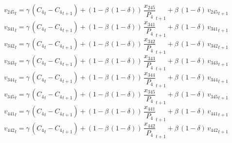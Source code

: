 \begin{dmath}
{{v_{245}}}_{t}={{\gamma}}\, \left({{C_{4}}}_{t}-{{C_{4}}}_{t+1}\right)+\left(1-{{\beta}}\, \left(1-{{\delta}}\right)\right)\, {{\frac{x_{245}}{P_{4}}}}_{t+1}+{{\beta}}\, \left(1-{{\delta}}\right)\, {{v_{245}}}_{t+1}
\end{dmath}
\begin{dmath}
{{v_{341}}}_{t}={{\gamma}}\, \left({{C_{4}}}_{t}-{{C_{4}}}_{t+1}\right)+\left(1-{{\beta}}\, \left(1-{{\delta}}\right)\right)\, {{\frac{x_{341}}{P_{4}}}}_{t+1}+{{\beta}}\, \left(1-{{\delta}}\right)\, {{v_{341}}}_{t+1}
\end{dmath}
\begin{dmath}
{{v_{342}}}_{t}={{\gamma}}\, \left({{C_{4}}}_{t}-{{C_{4}}}_{t+1}\right)+\left(1-{{\beta}}\, \left(1-{{\delta}}\right)\right)\, {{\frac{x_{342}}{P_{4}}}}_{t+1}+{{\beta}}\, \left(1-{{\delta}}\right)\, {{v_{342}}}_{t+1}
\end{dmath}
\begin{dmath}
{{v_{343}}}_{t}={{\gamma}}\, \left({{C_{4}}}_{t}-{{C_{4}}}_{t+1}\right)+\left(1-{{\beta}}\, \left(1-{{\delta}}\right)\right)\, {{\frac{x_{343}}{P_{4}}}}_{t+1}+{{\beta}}\, \left(1-{{\delta}}\right)\, {{v_{343}}}_{t+1}
\end{dmath}
\begin{dmath}
{{v_{344}}}_{t}={{\gamma}}\, \left({{C_{4}}}_{t}-{{C_{4}}}_{t+1}\right)+\left(1-{{\beta}}\, \left(1-{{\delta}}\right)\right)\, {{\frac{x_{344}}{P_{4}}}}_{t+1}+{{\beta}}\, \left(1-{{\delta}}\right)\, {{v_{344}}}_{t+1}
\end{dmath}
\begin{dmath}
{{v_{345}}}_{t}={{\gamma}}\, \left({{C_{4}}}_{t}-{{C_{4}}}_{t+1}\right)+\left(1-{{\beta}}\, \left(1-{{\delta}}\right)\right)\, {{\frac{x_{345}}{P_{4}}}}_{t+1}+{{\beta}}\, \left(1-{{\delta}}\right)\, {{v_{345}}}_{t+1}
\end{dmath}
\begin{dmath}
{{v_{441}}}_{t}={{\gamma}}\, \left({{C_{4}}}_{t}-{{C_{4}}}_{t+1}\right)+\left(1-{{\beta}}\, \left(1-{{\delta}}\right)\right)\, {{\frac{x_{441}}{P_{4}}}}_{t+1}+{{\beta}}\, \left(1-{{\delta}}\right)\, {{v_{441}}}_{t+1}
\end{dmath}
\begin{dmath}
{{v_{442}}}_{t}={{\gamma}}\, \left({{C_{4}}}_{t}-{{C_{4}}}_{t+1}\right)+\left(1-{{\beta}}\, \left(1-{{\delta}}\right)\right)\, {{\frac{x_{442}}{P_{4}}}}_{t+1}+{{\beta}}\, \left(1-{{\delta}}\right)\, {{v_{442}}}_{t+1}
\end{dmath}
